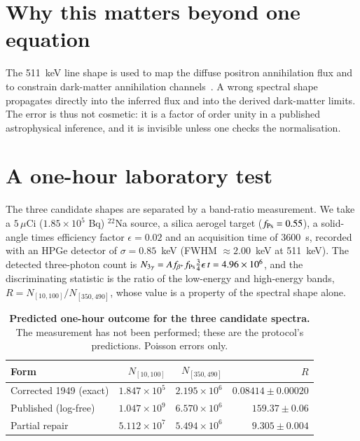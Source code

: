 \documentclass[letter]{aa}
\begin{document}
\section{Why this matters beyond one equation}
The 511~keV line shape is used to map the diffuse positron
annihilation flux and to constrain dark-matter annihilation
channels~\citep{sy26,yoneda25}. A wrong spectral shape propagates
directly into the inferred flux and into the derived dark-matter
limits. The error is thus not cosmetic: it is a factor of order
unity in a published astrophysical inference, and it is invisible
unless one checks the normalisation.

\section{A one-hour laboratory test}
The three candidate shapes are separated by a band-ratio measurement.
We take a $5\,\mu$Ci ($1.85\times 10^{5}$ Bq) $^{22}$Na source,
a silica aerogel target ($f_{\rm Ps} = 0.55$), a solid-angle
times efficiency factor $\epsilon = 0.02$ and an acquisition time
of $3600$~s, recorded with an HPGe detector of
$\sigma = 0.85$~keV (FWHM $\approx 2.00$~keV at 511~keV). The
detected three-photon count is
$N_{3\gamma} = A f_{\beta^+} f_{\rm Ps} \tfrac{3}{4}\epsilon\,t = 4.96\times 10^{6}$,
and the discriminating statistic is the ratio of the low-energy and
high-energy bands,
$R = N_{[10,100]}/N_{[350,490]}$, whose value is a property of the
spectral shape alone.

\begin{table}[!htbp]
\centering\footnotesize
\setlength{\tabcolsep}{2.5pt}
\caption{\textbf{Predicted one-hour outcome for the three candidate spectra.}
The measurement has not been performed; these are the protocol's
predictions. Poisson errors only.}
\label{tab:na22}
\vspace{0.1cm}
\begin{tabular}{@{}lrrr@{}}
\toprule
Form & $N_{[10,100]}$ & $N_{[350,490]}$ & $R$ \\
\midrule
Corrected 1949 (exact) & $1.847\times 10^{5}$ & $2.195\times 10^{6}$ & $0.08414\pm 0.00020$ \\
Published (log-free) & $1.047\times 10^{9}$ & $6.570\times 10^{6}$ & $159.37\pm 0.06$ \\
Partial repair & $5.112\times 10^{7}$ & $5.494\times 10^{6}$ & $9.305\pm 0.004$ \\
\bottomrule
\end{tabular}
\end{table}
\end{document}
